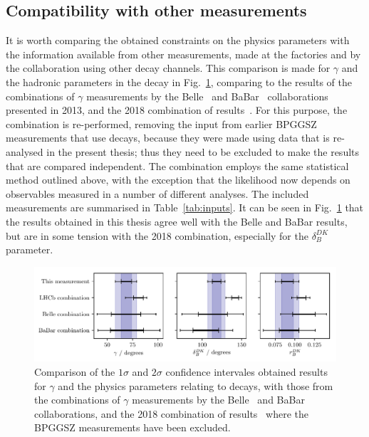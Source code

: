 \subsection{Compatibility with other measurements} %
\label{sub:compatibility_with_other_measurements}

It is worth comparing the obtained constraints on the physics parameters with the information available from other measurements, made at the \B factories and by the \lhcb collaboration using other decay channels. This comparison is made for $\gamma$ and the hadronic parameters in the \BtoDK decay in Fig.~\ref{fig:all_gamma_results}, comparing to the results of the combinations of $\gamma$ measurements by the Belle~\cite{BelleCombo} and BaBar~\cite{BabarCombo} collaborations presented in 2013, and the 2018 combination of \lhcb results~\cite{LHCb-CONF-2018-002}. For this purpose, the \lhcb combination is re-performed,  removing the input from earlier BPGGSZ measurements that use \BtoDK decays, because they were made using data that is re-analysed in the present thesis; thus they need to be excluded to make the results that are compared independent. The combination employs the same statistical method outlined above, with the exception that the likelihood now depends on observables measured in a number of different analyses. The included measurements are summarised in Table~\ref{tab:inputs}. It can be seen in Fig.~\ref{fig:all_gamma_results} that the results obtained in this thesis agree well with the Belle and BaBar results, but are in some tension with the 2018 \lhcb combination, especially for the $\delta_B^{DK}$ parameter.

\begin{figure}[tb]
    \centering
    \includegraphics[width=\columnwidth]{figures/analysis/interpretation/experiment_comparison.pdf}
    \caption{Comparison of the $1\sigma$ and $2\sigma$ confidence intervales obtained results for $\gamma$ and the physics parameters relating to \BtoDK decays, with those from the combinations of $\gamma$ measurements by the Belle~\cite{BelleCombo} and BaBar~\cite{BabarCombo} collaborations, and the 2018 combination of \lhcb results~\cite{LHCb-CONF-2018-002} where the BPGGSZ measurements have been excluded.}
    \label{fig:all_gamma_results}
\end{figure}

